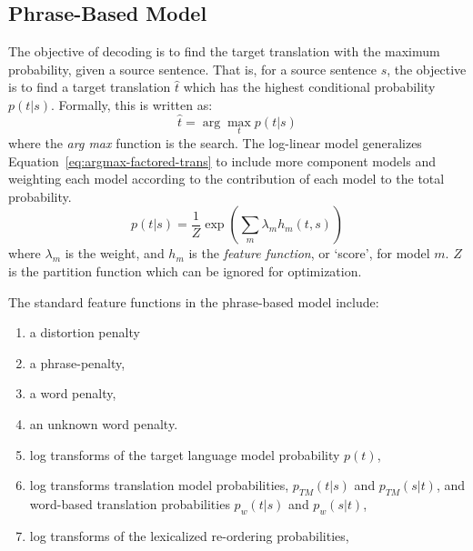 \documentclass[11pt]{article}
\begin{document}
\subsection{Phrase-Based Model}

The objective of decoding is to find the target translation with the maximum probability, given a source sentence. That is, for a source sentence $s$, the objective is to find a target translation $\hat{t}$ which has the highest conditional probability $p(t | s)$. Formally, this is written as:
\begin{equation}
\hat{t} = \arg \max_t p( t | s )
\label{eq:argmax-factored-trans}
\end{equation}
where the \emph{arg max} function is the search. The log-linear model generalizes Equation~\ref{eq:argmax-factored-trans} to include more component models and weighting each model according to the contribution of each model to the total probability. 
\begin{equation}
\label{eq:Log-Linear}
p(t | s) 	=  \frac{1}{Z} \exp ( \sum_m \lambda_m h_m ( t, s)^{} )
\end{equation}
where $\lambda_m$ is the weight, and $h_m$ is the \emph{feature function}, or `score', for model $m$. $Z$ is the partition function which can be ignored for optimization. 

The standard feature functions in the phrase-based model include:
\begin{enumerate}
  \item \vspace{-2 mm} a distortion penalty
  \item \vspace{-2 mm} a phrase-penalty,
  \item \vspace{-2 mm} a word penalty,
  \item \vspace{-2 mm} an unknown word penalty.
  \item \vspace{-2 mm} log transforms of the target language model probability $p(t)$, 
  \item \vspace{-2 mm} log transforms translation model probabilities, $p_{TM}(t|s) $ and $p_{TM}(s|t)$, and word-based translation probabilities $p_w(t|s)$ and $p_w(s|t)$,
  \item \vspace{-2 mm} log transforms of the lexicalized re-ordering probabilities,
\end{enumerate}
\end{document}
